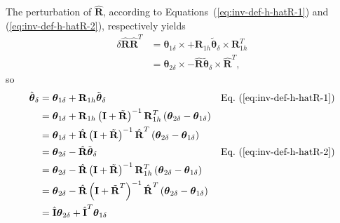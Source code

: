 \documentclass[10pt,dvips,fleqn,subeqn]{report}
\newcommand{\T}[1]{\bm{\mathbf{#1}}}
\begin{document}
The perturbation of $\hat{\T{R}}$, according 
to Equations~(\ref{eq:inv-def-h-hatR-1}) and (\ref{eq:inv-def-h-hatR-2}),
respectively yields
\begin{align}
	\delta\hat{\T{R}} \hat{\T{R}}^T
	&= \T{\theta}_{1\delta} \times
		+ \T{R}_{1h} \tilde{\T{\theta}}_{\delta}\times \T{R}_{1h}^T \nonumber \\
	&= \T{\theta}_{2\delta} \times
		- \hat{\T{R}} \tilde{\T{\theta}}_{\delta}\times \hat{\T{R}}^T ,
\end{align}
so
\begin{align}
	\hat{\T{\theta}}_{\delta}
	&= \T{\theta}_{1\delta}
		+ \T{R}_{1h} \tilde{\T{\theta}}_{\delta}
		&& \text{Eq.~(\ref{eq:inv-def-h-hatR-1})} \nonumber \\
	&= \T{\theta}_{1\delta}
		+ \T{R}_{1h} \plbr{\T{I} + \tilde{\T{R}}}^{-1}
		\T{R}_{1h}^T \plbr{\T{\theta}_{2\delta} - \T{\theta}_{1\delta}} \nonumber \\
	&= \T{\theta}_{1\delta}
		+ \hat{\T{R}} \plbr{\T{I} + \tilde{\T{R}}}^{-1}
		\hat{\T{R}}^T \plbr{\T{\theta}_{2\delta} - \T{\theta}_{1\delta}} \nonumber \\
	&= \T{\theta}_{2\delta}
		- \hat{\T{R}} \tilde{\T{\theta}}_{\delta}
		&& \text{Eq.~(\ref{eq:inv-def-h-hatR-2})} \nonumber \\
	&= \T{\theta}_{2\delta}
		- \hat{\T{R}} \plbr{\T{I} + \tilde{\T{R}}}^{-1}
		\T{R}_{1h}^T \plbr{\T{\theta}_{2\delta} - \T{\theta}_{1\delta}} \nonumber \\
	&= \T{\theta}_{2\delta}
		- \hat{\T{R}} \plbr{\T{I} + \tilde{\T{R}}^T}^{-1}
		\hat{\T{R}}^T \plbr{\T{\theta}_{2\delta} - \T{\theta}_{1\delta}} \nonumber \\
	&= \hat{\T{I}} \T{\theta}_{2\delta}
		+ \hat{\T{I}}^T \T{\theta}_{1\delta}
\end{align}
\end{document}

